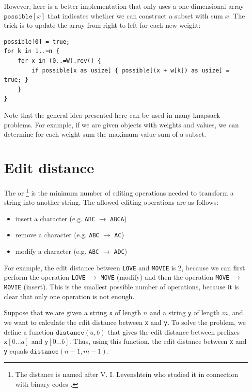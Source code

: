However, here is a better implementation that only uses
a one-dimensional array $\texttt{possible}[x]$
that indicates whether we can construct a subset with sum $x$.
The trick is to update the array from right to left for
each new weight:
\begin{lstlisting}
possible[0] = true;
for k in 1..=n {
    for x in (0..=W).rev() {
        if possible[x as usize] { possible[(x + w[k]) as usize] = true; }
    }
}
\end{lstlisting}

Note that the general idea presented here can be used
in many knapsack problems.
For example, if we are given objects with weights and values,
we can determine for each weight sum the maximum value
sum of a subset.

\section{Edit distance}


The  or \footnote{The distance
is named after V. I. Levenshtein who studied it in connection with binary codes \cite{lev66}.}
is the minimum number of editing operations
needed to transform a string
into another string.
The allowed editing operations are as follows:
\begin{itemize}
\item insert a character (e.g. \texttt{ABC} $\rightarrow$ \texttt{ABCA})
\item remove a character (e.g. \texttt{ABC} $\rightarrow$ \texttt{AC})
\item modify a character (e.g. \texttt{ABC} $\rightarrow$ \texttt{ADC})
\end{itemize}

For example, the edit distance between
\texttt{LOVE} and \texttt{MOVIE} is 2,
because we can first perform the operation
 \texttt{LOVE} $\rightarrow$ \texttt{MOVE}
(modify) and then the operation
\texttt{MOVE} $\rightarrow$ \texttt{MOVIE}
(insert).
This is the smallest possible number of operations,
because it is clear that only one operation is not enough.

Suppose that we are given a string \texttt{x}
of length $n$ and a string \texttt{y} of length $m$,
and we want to calculate the edit distance between
\texttt{x} and \texttt{y}.
To solve the problem, we define a function
$\texttt{distance}(a,b)$ that gives the
edit distance between prefixes
$\texttt{x}[0 \ldots a]$ and $\texttt{y}[0 \ldots b]$.
Thus, using this function, the edit distance
between \texttt{x} and \texttt{y} equals $\texttt{distance}(n-1,m-1)$.

